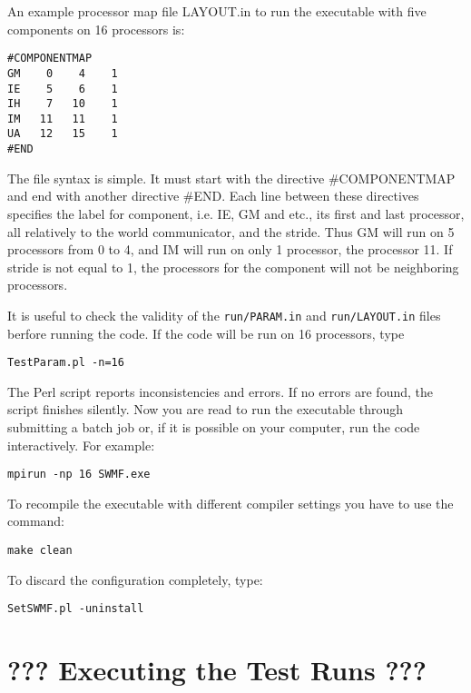An example processor map file LAYOUT.in to run the executable with
five components on 16 processors is:
\begin{verbatim}
#COMPONENTMAP
GM    0    4    1
IE    5    6    1
IH    7   10    1
IM   11   11    1
UA   12   15    1
#END
\end{verbatim}
The file syntax is simple. It must start with the directive
\#COMPONENTMAP and end with another directive \#END. Each line between
these directives specifies the label for component, i.e. IE, GM and
etc., its first and last processor, all relatively to the world
communicator, and the stride. Thus GM will run on 5 processors from 0
to 4, and IM will run on only 1 processor, the processor 11.  If
stride is not equal to 1, the processors for the component will not be
neighboring processors.

It is useful to check the validity of the {\tt run/PARAM.in} and 
{\tt run/LAYOUT.in} files berfore running the code. If the
code will be run on 16 processors, type
\begin{verbatim}
TestParam.pl -n=16
\end{verbatim}
The Perl script reports inconsistencies and errors. 
If no errors are found, the script finishes silently.
Now you are read to run the executable through submitting a batch job or, 
if it is possible on your computer, run the code interactively.  For example:
\begin{verbatim}
mpirun -np 16 SWMF.exe
\end{verbatim}
To recompile the executable with different compiler settings you have
to use the command:
\begin{verbatim}
make clean
\end{verbatim} 
To discard the configuration completely, type:
\begin{verbatim}
SetSWMF.pl -uninstall
\end{verbatim} 

\section{??? Executing the Test Runs ???}


